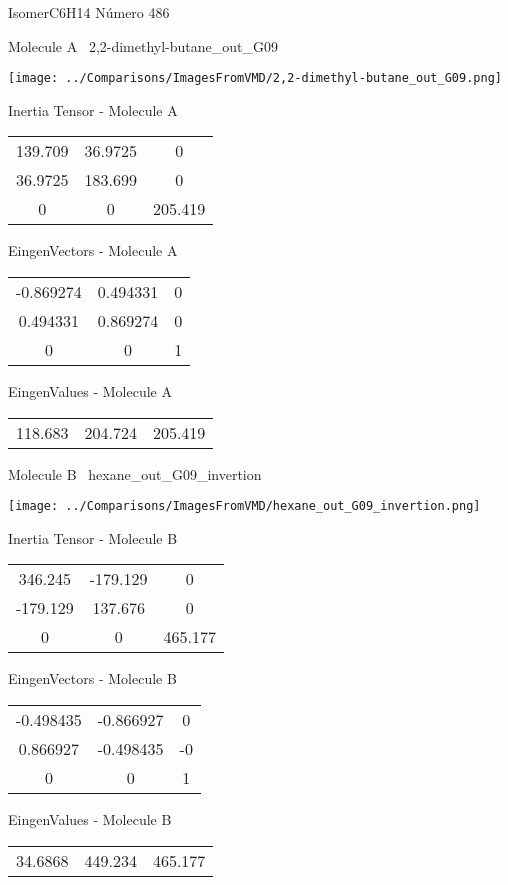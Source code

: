 \vtab[-3cm]
\begin{center}
{\large IsomerC6H14 \tab Número 486}
\end{center}
\begin{multicols}{2}
\begin{center}

Molecule A \
2,2-dimethyl-butane\_out\_G09

\texttt{[image: ../Comparisons/ImagesFromVMD/2,2-dimethyl-butane\_out\_G09.png]}

Inertia Tensor - Molecule A \\
\begin{tabular}{|c c c|}
139.709	 & 	36.9725	 & 	0	 \\
36.9725	 & 	183.699	 & 	0	 \\
0	 & 	0	 & 	205.419
\end{tabular}

\vtab
 EingenVectors - Molecule A     \\
\begin{tabular}{|c c c|}
-0.869274	 & 	0.494331	 & 	0	 \\
0.494331	 & 	0.869274	 & 	0	 \\
0	 & 	0	 & 	1
\end{tabular}

\vtab
 EingenValues - Molecule A     \\
\begin{tabular}{|c c c|}
118.683	 & 	204.724	 & 	205.419	 \\
\end{tabular}
\columnbreak

Molecule B \
hexane\_out\_G09\_invertion

\texttt{[image: ../Comparisons/ImagesFromVMD/hexane\_out\_G09\_invertion.png]}

Inertia Tensor - Molecule B \\
\begin{tabular}{|c c c|}
346.245	 & 	-179.129	 & 	0	 \\
-179.129	 & 	137.676	 & 	0	 \\
0	 & 	0	 & 	465.177
\end{tabular}

\vtab
 EingenVectors - Molecule B     \\
\begin{tabular}{|c c c|}
-0.498435	 & 	-0.866927	 & 	0	 \\
0.866927	 & 	-0.498435	 & 	-0	 \\
0	 & 	0	 & 	1
\end{tabular}

\vtab
 EingenValues - Molecule B     \\
\begin{tabular}{|c c c|}
34.6868	 & 	449.234	 & 	465.177	 \\
\end{tabular}

\end{center}
\end{multicols}

